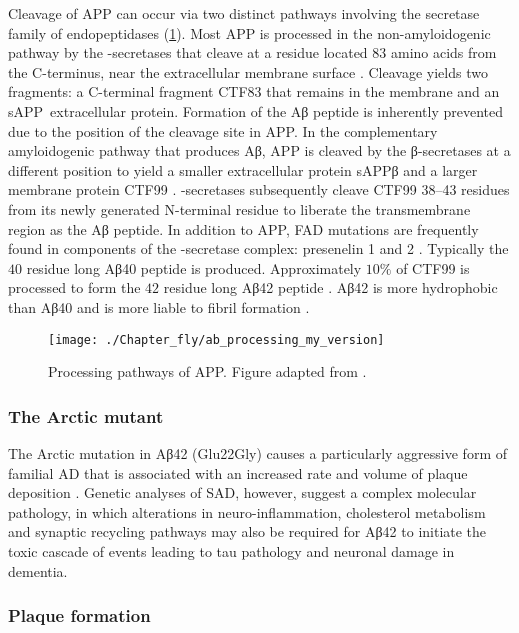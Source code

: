 Cleavage of APP can occur via two distinct pathways involving the secretase family of
endopeptidases (\ref{fig:ab_processing}).
Most APP is processed in the non-amyloidogenic pathway by the \textalpha-secretases
that cleave at a residue located $83$ amino acids from the C-terminus,
near the extracellular membrane surface \cite{Chow2010}.
Cleavage yields two fragments: a C-terminal fragment CTF83 that remains in the
membrane and an sAPP\textalpha\ extracellular protein.
Formation of the Aβ peptide is inherently prevented due to the position of the
cleavage site in APP.
In the complementary amyloidogenic pathway that produces Aβ,
APP is cleaved by the β-secretases at a different position to yield a smaller
extracellular protein sAPPβ and a larger membrane protein CTF99 \cite{Chow2010}.
\textgamma-secretases subsequently cleave CTF99 \numrange{38}{43} residues from its
newly generated N-terminal residue to liberate the transmembrane region as the Aβ peptide.
In addition to APP, FAD mutations are frequently found in components of the
\textgamma-secretase complex: presenelin 1 and 2 \cite{Chow2010}.
Typically the $40$ residue long Aβ40 peptide is produced.
Approximately $10\%$ of CTF99 is processed to form the $42$ residue long
Aβ42 peptide \cite{LaFerla2007}.
Aβ42 is more hydrophobic than Aβ40 and is more liable to fibril formation \cite{Jarrett1993}.

\begin{figure}[!hbt]
    \centering
    \texttt{[image: ./Chapter\_fly/ab\_processing\_my\_version]}
    \caption{%
        Processing pathways of APP.
        Figure adapted from \cite{LaFerla2007}.
    }
    \label{fig:ab_processing}
\end{figure}

\subsubsection{The Arctic mutant}

The Arctic mutation in Aβ42 (Glu22Gly) \cite{Mullan1992} causes a particularly
aggressive form of familial AD that is associated with an increased rate and
volume of plaque deposition \cite{Nilsberth2001}.
Genetic analyses of SAD, however, suggest a complex molecular pathology,
in which alterations in neuro-inflammation, cholesterol metabolism and synaptic recycling
pathways may also be required for Aβ42 to initiate the toxic cascade of events
leading to tau pathology and neuronal damage in dementia.

\subsubsection{Plaque formation}

